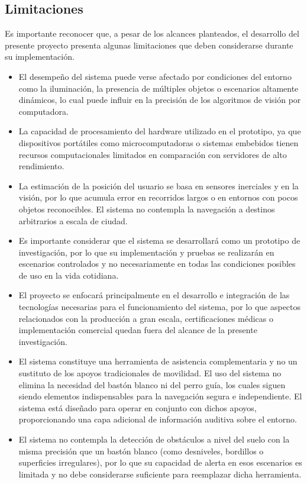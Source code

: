 \subsection{Limitaciones}

Es importante reconocer que, a pesar de los alcances planteados, el desarrollo del presente proyecto presenta algunas limitaciones que deben considerarse durante su implementación.

\begin{itemize}
    \item El desempeño del sistema puede verse afectado por condiciones del entorno como la iluminación, la presencia de múltiples objetos o escenarios altamente dinámicos, lo cual puede influir en la precisión de los algoritmos de visión por computadora.
    \item La capacidad de procesamiento del hardware utilizado en el prototipo, ya que dispositivos portátiles como microcomputadoras o sistemas embebidos tienen recursos computacionales limitados en comparación con servidores de alto rendimiento.
    \item La estimación de la posición del usuario se basa en sensores inerciales y en la visión, por lo que acumula error en recorridos largos o en entornos con pocos objetos reconocibles. El sistema no contempla la navegación a destinos arbitrarios a escala de ciudad.
    \item Es importante considerar que el sistema se desarrollará como un prototipo de investigación, por lo que su implementación y pruebas se realizarán en escenarios controlados y no necesariamente en todas las condiciones posibles de uso en la vida cotidiana.
    \item El proyecto se enfocará principalmente en el desarrollo e integración de las tecnologías necesarias para el funcionamiento del sistema, por lo que aspectos relacionados con la producción a gran escala, certificaciones médicas o implementación comercial quedan fuera del alcance de la presente investigación.
    \item El sistema constituye una herramienta de asistencia complementaria y no un sustituto de los apoyos tradicionales de movilidad. El uso del sistema no elimina la necesidad del bastón blanco ni del perro guía, los cuales siguen siendo elementos indispensables para la navegación segura e independiente. El sistema está diseñado para operar en conjunto con dichos apoyos, proporcionando una capa adicional de información auditiva sobre el entorno.
    \item El sistema no contempla la detección de obstáculos a nivel del suelo con la misma precisión que un bastón blanco (como desniveles, bordillos o superficies irregulares), por lo que su capacidad de alerta en esos escenarios es limitada y no debe considerarse suficiente para reemplazar dicha herramienta.

\end{itemize}
